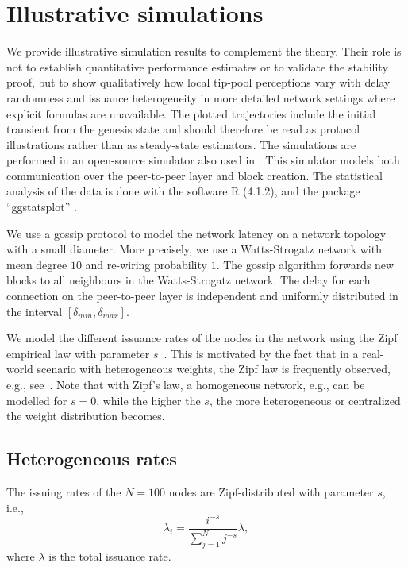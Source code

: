\documentclass[a4paper,12pt,oneside,reqno]{amsart}
\newcommand{\1}{{\mathbf 1}}
\begin{document}
\section{Illustrative simulations}\label{sec:simulations}
We provide illustrative simulation results to complement the theory. Their role is not to establish quantitative performance estimates or to validate the stability proof, but to show qualitatively how local tip-pool perceptions vary with delay randomness and issuance heterogeneity in more detailed network settings where explicit formulas are unavailable. The plotted trajectories include the initial transient from the genesis state and should therefore be read as protocol illustrations rather than as steady-state estimators.
The simulations are performed in an open-source simulator \cite{otv-simulator} also used in \cite{robustnessIOTA2.0}. This simulator models both communication over the peer-to-peer layer and block creation.
The statistical analysis of the data is done with the software R (4.1.2), and the package ``ggstatsplot'' \cite{ggstatsplot}. 

We use a gossip protocol to model the network latency on a network topology with a small diameter. More precisely, we use a Watts-Strogatz network \cite{Watts1998collective} with mean degree $10$ and re-wiring probability $1$. 
The gossip algorithm forwards new blocks to all neighbours in the Watts-Strogatz network. The delay for each connection on the peer-to-peer layer is independent and uniformly distributed in the interval $[\delta_{min}, \delta_{max}]$.

We model the different issuance rates of the nodes in the network using the Zipf empirical law with parameter $s$~\cite{zipfs-law}. This is motivated by the fact that in a real-world scenario with heterogeneous weights, the Zipf law is frequently observed, e.g., see~\cite{Adamic2002ZipfsLA,wealth_pareto,Li2002ZipfsLE}. Note that with Zipf's law, a homogeneous network, e.g., can be modelled for $s=0$, while the higher the $s$, the more heterogeneous or centralized the weight distribution becomes. 

\subsection{Heterogeneous rates}
The issuing rates of the $N=100$ nodes are Zipf-distributed with parameter $s$, i.e.,
\begin{equation}
    \lambda_i = \frac{i^{-s}}{\sum_{j=1}^N j^{-s}} \lambda,
\end{equation}
where $\lambda$ is the total issuance rate. 
\end{document}
